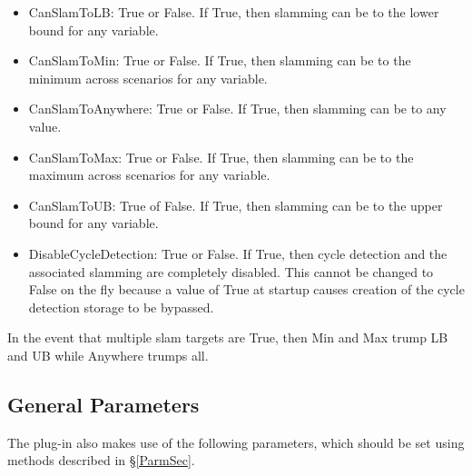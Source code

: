 \begin{itemize}
  \item CanSlamToLB: True or False. If True, then slamming can be to the lower
  bound for any variable.

  \item CanSlamToMin: True or False. If True, then slamming can be to the
  minimum across scenarios for any variable.

  \item CanSlamToAnywhere: True or False. If True, then slamming can be to any
  value.

  \item CanSlamToMax: True or False. If True, then slamming can be to the
  maximum across scenarios for any variable.

  \item CanSlamToUB: True of False. If True, then slamming can be to the upper
  bound for any variable.

  \item DisableCycleDetection: True or False. If True, then cycle detection and
  the associated slamming are completely disabled. This cannot be changed to
  False on the fly because a value of True at startup causes creation of the
  cycle detection storage to be bypassed.
\end{itemize}

In the event that multiple slam targets are True, then Min and Max trump LB and
UB while Anywhere trumps all.

\subsection{General Parameters}

The plug-in also makes use of the following parameters, which should be set
using methods described in \S\ref{ParmSec}.

